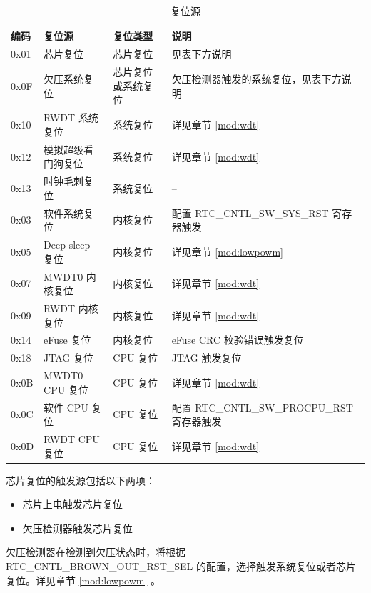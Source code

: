 \documentclass[main\_\_CN.tex]{subfiles}
\begin{document}
\begin{table}[H]
    \centering
    \caption{复位源}
    \label{tab:resclk-reset-src}
    \begin{threeparttable}
    \begin{tabular}{ |l|m{3.5cm}|m{1.8cm}|m{9.2cm}| }
    \hline
\rowcolor{lightgray}
\textbf{编码} & \textbf{复位源} & \textbf{复位类型} &   \textbf{说明} \\\hline
        0x01 & 芯片复位 & 芯片复位 &  见表下方说明\tnote{1}\\
        \hline
        0x0F & 欠压系统复位 & 芯片复位或系统复位 & 欠压检测器触发的系统复位，见表下方说明\tnote{2}\\
        \hline
        0x10 & RWDT 系统复位 & 系统复位 & 详见章节 \ref{mod:wdt} \textit{\nameref{mod:wdt}}
        \\\hline
        0x12 & 模拟超级看门狗复位 & 系统复位 & 详见章节 \ref{mod:wdt} \textit{\nameref{mod:wdt}}
        \\\hline
        0x13 & 时钟毛刺复位 & 系统复位 & –
        \\\hline
        0x03 & 软件系统复位 & 内核复位 & 配置 RTC\_CNTL\_SW\_SYS\_RST 寄存器触发\\
        \hline
        0x05 & Deep-sleep 复位 & 内核复位 & 详见章节 \ref{mod:lowpowm} \textit{\nameref{mod:lowpowm}}
        \\\hline
        0x07 & MWDT0 内核复位 & 内核复位 & 详见章节 \ref{mod:wdt} \textit{\nameref{mod:wdt}}
        \\\hline
        0x09 & RWDT 内核复位 & 内核复位 & 详见章节 \ref{mod:wdt} \textit{\nameref{mod:wdt}}
        \\\hline
        0x14 & eFuse 复位 & 内核复位 & eFuse CRC 校验错误触发复位
        \\\hline
        0x18 & JTAG 复位 & CPU 复位 & JTAG 触发复位
        \\\hline
        0x0B & MWDT0 CPU 复位 & CPU 复位 & 详见章节 \ref{mod:wdt} \textit{\nameref{mod:wdt}}
        \\\hline
         0x0C & 软件 CPU 复位 & CPU 复位 & 配置 RTC\_CNTL\_SW\_PROCPU\_RST 寄存器触发\\
        \hline
        0x0D & RWDT CPU 复位 & CPU 复位 & 详见章节 \ref{mod:wdt} \textit{\nameref{mod:wdt}}
        \\\hline
\end{tabular}

        \begin{tablenotes}
            \item[1] 芯片复位的触发源包括以下两项：
                \begin{itemize}
                \item 芯片上电触发芯片复位
                \item 欠压检测器触发芯片复位
                \end{itemize}
            \item[2] 欠压检测器在检测到欠压状态时，将根据 RTC\_CNTL\_BROWN\_OUT\_RST\_SEL 的配置，选择触发系统复位或者芯片复位。详见章节 \ref{mod:lowpowm} \textit{}。
        \end{tablenotes}
     \end{threeparttable}
    \end{table}
\end{document}
